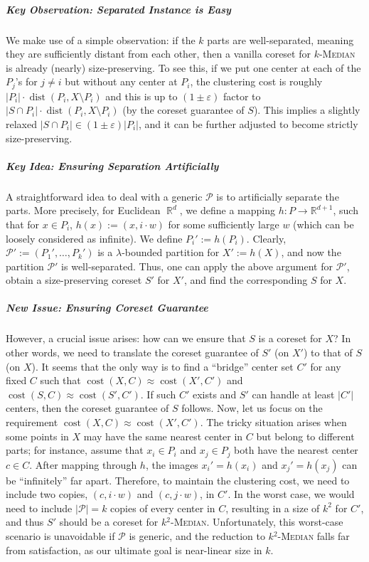 \documentclass[letterpaper,11pt]{article}
\theoremstyle{plain}
\theoremstyle{definition}
\theoremstyle{remark}
\DeclareMathOperator{\R}{\mathbb{R}}
\DeclareMathOperator{\cost}{cost}
\DeclareMathOperator{\dist}{dist}
\newcommand{\eps}{\varepsilon}
\renewcommand{\epsilon}{\varepsilon}
\newcommand{\calP}{\mathcal{P}}
\newcommand{\ProblemName}[1]{\textsc{#1}}
\begin{document}
\subparagraph{Key Observation: Separated Instance is Easy} 

We make use of a simple observation: 
if the $k$ parts are well-separated, meaning they are sufficiently distant from each other, then a vanilla coreset for $k$-\textsc{Median} is already (nearly) size-preserving.
To see this, if we put one center at each of the $P_j$'s for $j \neq i$ but without any center at $P_i$,
the clustering cost is roughly $|P_i| \cdot \dist(P_i, X \setminus P_i)$ and this is up to $(1\pm\eps)$ factor
to $|S \cap P_i| \cdot \dist(P_i, X \setminus P_i)$ (by the coreset guarantee of $S$).
This implies a slightly relaxed $|S \cap P_i| \in (1 \pm \epsilon) |P_i|$, and it can be further adjusted to become strictly size-preserving.


\subparagraph{Key Idea: Ensuring Separation Artificially} 
A straightforward idea to deal with a generic $\calP$ is to artificially separate the parts. 
More precisely, for Euclidean $\R^d$, we define a mapping $h : P \to \mathbb{R}^{d + 1}$, such that for $x \in P_i$,
$h(x) := (x, i \cdot w)$ for some sufficiently large $w$ (which can be loosely considered as infinite).
We define $P_i' := h(P_i)$. 
Clearly, $\calP' := (P_1', \ldots, P_k')$ is a $\lambda$-bounded partition for $X' := h(X)$, and now the partition $\calP'$ is well-separated. Thus, one can apply the above argument for $\calP'$, obtain a size-preserving coreset $S'$ for $X'$,
and find the corresponding $S$ for $X$.

\subparagraph{New Issue: Ensuring Coreset Guarantee} However, a crucial issue arises: how can we ensure that $S$ is a coreset for $X$? In other words, we need to translate the coreset guarantee of $S'$ (on $X'$) to that of $S$ (on $X$). 
It seems that the only way is to find a ``bridge'' center set $C'$ for any fixed $C$ such that $\cost(X,C) \approx \cost(X',C')$ and $\cost(S,C) \approx \cost(S',C')$. If such $C'$ exists and $S'$ can handle at least $|C'|$ centers, then the coreset guarantee of $S$ follows. 
Now, let us focus on the requirement $\cost(X,C)\approx\cost(X',C')$. The tricky situation arises when some points in $X$ may have the same nearest center in $C$ but belong to different parts; for instance, assume that $x_i \in P_i$ and $x_j \in P_j$ both have the nearest center $c \in C$. After mapping through $h$, the images $x_i' = h(x_i)$ and $x_j' = h(x_j)$ can be ``infinitely'' far apart. Therefore, to maintain the clustering cost, we need to include two copies, $(c, i \cdot w)$ and $(c, j \cdot w)$, in $C'$. In the worst case, we would need to include $|\calP| = k$ copies of every center in $C$, resulting in a size of $k^2$ for $C'$, and thus $S'$ should be a coreset for \ProblemName{$k^2$-Median}. Unfortunately, this worst-case scenario is unavoidable if $\calP$ is generic, and the reduction to \ProblemName{$k^2$-Median}\xspace falls far from satisfaction, as our ultimate goal is near-linear size in $k$.
\end{document}
